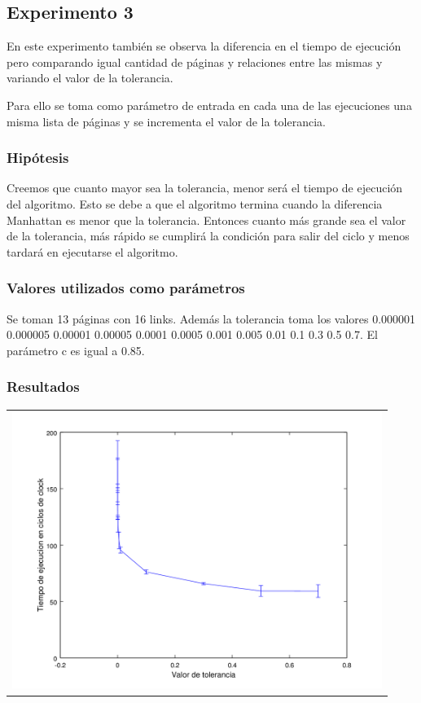 	\subsection{Experimento 3}
	En este experimento también se observa la diferencia en el tiempo de ejecución pero comparando igual cantidad de páginas y relaciones entre las mismas y variando el valor de la tolerancia.

	Para ello se toma como parámetro de entrada en cada una de las ejecuciones una misma lista de páginas y se incrementa el valor de la tolerancia.

		\subsubsection*{Hipótesis} 
		Creemos que cuanto mayor sea la tolerancia, menor será el tiempo de ejecución del algoritmo. Esto se debe a que el algoritmo termina cuando la diferencia Manhattan es menor que la tolerancia. Entonces cuanto más grande sea el valor de la tolerancia, más rápido se cumplirá la condición para salir del ciclo y menos tardará en ejecutarse el algoritmo. 

		\subsubsection*{Valores utilizados como parámetros} 
		Se toman 13 páginas con 16 links. Además la tolerancia toma los valores 0.000001 0.000005 0.00001 0.00005 0.0001 0.0005 0.001 0.005 0.01 0.1 0.3 0.5 0.7. El parámetro c es igual a 0.85.

		\subsubsection*{Resultados}
			{\centering \begin{tabular}{c}
		      \includegraphics[width=12cm]{../../src/exp/graficos/exp3.png} \\
		    \end{tabular}}

